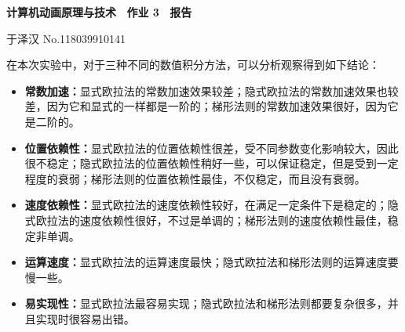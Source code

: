 \documentclass[a4paper, 12pt]{article}
\begin{document}
\begin{center}
{\bfseries {计算机动画原理与技术 ~作业 3 ~报告}}

\vspace{0.5\baselineskip}

{ \kaishu 于泽汉 \hspace{1em} \textsf{No.118039910141}}
\end{center}

\noindent 在本次实验中，对于三种不同的数值积分方法，可以分析观察得到如下结论：

\begin{itemize}[leftmargin=2em, label={}]
\item \textbf{常数加速：}显式欧拉法的常数加速效果较差；隐式欧拉法的常数加速效果也较差，因为它和显式的一样都是一阶的；梯形法则的常数加速效果很好，因为它是二阶的。

\item \textbf{位置依赖性：}显式欧拉法的位置依赖性很差，受不同参数变化影响较大，因此很不稳定；隐式欧拉法的位置依赖性稍好一些，可以保证稳定，但是受到一定程度的衰弱；梯形法则的位置依赖性最佳，不仅稳定，而且没有衰弱。

\item \textbf{速度依赖性：}显式欧拉法的速度依赖性较好，在满足一定条件下是稳定的；隐式欧拉法的速度依赖性很好，不过是单调的；梯形法则的速度依赖性最佳，稳定非单调。

\item \textbf{运算速度：}显式欧拉法的运算速度最快；隐式欧拉法和梯形法则的运算速度要慢一些。

\item \textbf{易实现性：}显式欧拉法最容易实现；隐式欧拉法和梯形法则都要复杂很多，并且实现时很容易出错。

\end{itemize}

\vspace{\baselineskip}
\end{document}
